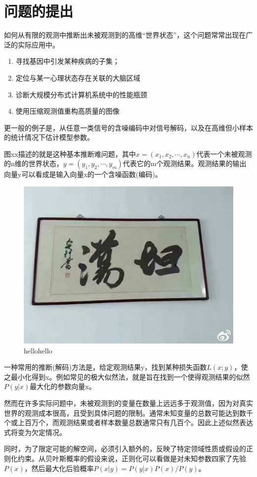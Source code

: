 \section{问题的提出}
如何从有限的观测中推断出未被观测到的高维“世界状态”，这个问题常常出现在广泛的实际应用中。



\begin{enumerate}
	\item 寻找基因中引发某种疾病的子集；
	\item 定位与某一心理状态存在关联的大脑区域	
	\item 诊断大规模分布式计算机系统中的性能瓶颈
	\item 使用压缩观测值重构高质量的图像
\end{enumerate}

更一般的例子是，从任意一类信号的含噪编码中对信号解码，以及在高维但小样本的统计情况下估计模型参数。

图xx描述的就是这种基本推断难问题，其中$x=(x_1,x_2,\cdots,x_n)$代表一个未被观测的n维的世界状态，$y=(y_1,y_2,\cdots,y_m)$代表它的m个观测结果。观测结果的输出向量y可以看成是输入向量x的一个含噪函数(编码)。
\begin{figure}[th]
	\centering
	\includegraphics[width=0.5\linewidth]{Img/Chap_Intro/fig1_1}
	\caption[hello]{hellohello}
	\label{fig:test}
\end{figure}
一种常用的推断(解码)方法是，给定观测结果y，找到某种损失函数$L(x;y)$，使之最小化得到x。例如常见的极大似然法，就是旨在找到一个使得观测结果的似然$P(y|x)$最大化的参数向量x。

然而在许多实际问题中，未被观测到的变量在数量上远远多于观测值，因为对真实世界的观测成本很高，且受到具体问题的限制。通常未知变量的总数可能达到数千个或上百万个，而观测结果或者样本数量总数通常只有几百个。因此上述似然表达式将变为欠定情况。

同时，为了限定可能的解空间，必须引入额外的，反映了特定领域性质或假设的正则化约束。从贝叶斯概率的假设来说，正则化可以看做是对未知参数四家了先验$P(x)$，然后最大化后验概率$P(x|y)=P(y|x)P(x)/P(y)$。

